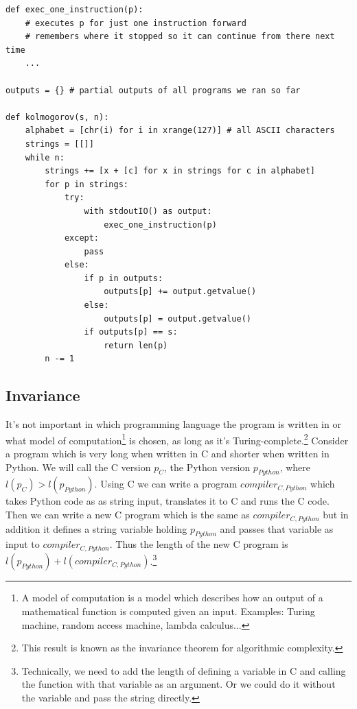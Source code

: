 \newpage

\begin{lstlisting}[caption={Approximating algorithmic complexity by limiting the number of instructions $n$ the programs are being executed, as well as the number of different programs which are being executed. As you run this for larger and larger $n$, the return value becomes smaller and smaller, until you reach $K(s)$ and the return value remains $K(s)$ from then on. We say that $K(x)$ is computable in the limit from above. If we were to modify this program so as to put a hard limit on the maximum program length, we could approximate the lower bound of $K(x)$.}]
def exec_one_instruction(p):
	# executes p for just one instruction forward 
	# remembers where it stopped so it can continue from there next time
	...

outputs = {} # partial outputs of all programs we ran so far

def kolmogorov(s, n):
	alphabet = [chr(i) for i in xrange(127)] # all ASCII characters
	strings = [[]]
	while n:
		strings += [x + [c] for x in strings for c in alphabet]
		for p in strings:
			try:
				with stdoutIO() as output:
					exec_one_instruction(p)
			except:
				pass
			else:
				if p in outputs:
					outputs[p] += output.getvalue()
				else:
					outputs[p] = output.getvalue()
				if outputs[p] == s:
					return len(p)
		n -= 1
\end{lstlisting}

\newpage

\subsection{Invariance}

It's not important in which programming language the program is written in or what model of computation\footnote{A model of computation is a model which describes how an output of a mathematical function is computed given an input. Examples: Turing machine, random access machine, lambda calculus...} is chosen, as long as it's Turing-complete.\footnote{This result is known as the invariance theorem for algorithmic complexity.}
Consider a program which is very long when written in C and shorter when written in Python.
We will call the C version $p_C$, the Python version $p_{Python}$, where $l(p_C) > l(p_{Python})$.
Using C we can write a program $compiler_{C,Python}$ which takes Python code as as string input, translates it to C and runs the C code.
Then we can write a new C program which is the same as $compiler_{C,Python}$ but in addition it defines a string variable holding $p_{Python}$ and passes that variable as input to $compiler_{C,Python}$.
Thus the length of the new C program is $l(p_{Python}) + l(compiler_{C,Python})$.\footnote{Technically, we need to add the length of defining a variable in C and calling the function with that variable as an argument. Or we could do it without the variable and pass the string directly.}

